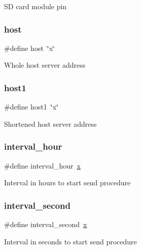 SD card module pin \mbox{\label{_w_s_8ino_ad9949162675c2cb74b115f5dfb224732}} 
\subsubsection{\texorpdfstring{host}{host}}
{\footnotesize\ttfamily \#define host~\char`\"{}x\char`\"{}}

Whole host server address \mbox{\label{_w_s_8ino_a9e2e38c07417ce7edf45d45a5a6b92c9}} 
\subsubsection{\texorpdfstring{host1}{host1}}
{\footnotesize\ttfamily \#define host1~\char`\"{}x\char`\"{}}

Shortened host server address \mbox{\label{_w_s_8ino_a4e07ce7aef83b2e94bd353d77029423e}} 
\subsubsection{\texorpdfstring{interval\+\_\+hour}{interval\_hour}}
{\footnotesize\ttfamily \#define interval\+\_\+hour~\hyperlink{_w_s_8ino_ab06e9aa782b61ccfb42f7c48996f6ed4}{x}}

Interval in hours to start send procedure \mbox{\label{_w_s_8ino_a0a56e85c196bfb2b3bf61abe7f007541}} 
\subsubsection{\texorpdfstring{interval\+\_\+second}{interval\_second}}
{\footnotesize\ttfamily \#define interval\+\_\+second~\hyperlink{_w_s_8ino_ab06e9aa782b61ccfb42f7c48996f6ed4}{x}}

Interval in seconds to start send procedure \mbox{\label{_w_s_8ino_a9f2587d1070b8924b276ba83988d3667}} 
